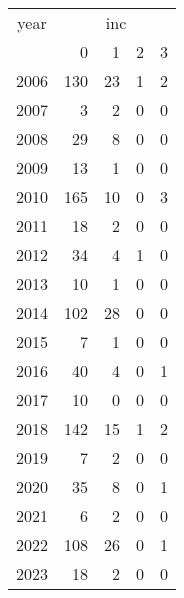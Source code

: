 \footnotesize\begin{tabular}[t]{lrrrr}
\toprule
\multicolumn{1}{c}{year} & \multicolumn{4}{c}{inc} \\
\cmidrule(l{3pt}r{3pt}){1-1} \cmidrule(l{3pt}r{3pt}){2-5}
  & 0 & 1 & 2 & 3\\
\midrule
2006 & 130 & 23 & 1 & 2\\
2007 & 3 & 2 & 0 & 0\\
2008 & 29 & 8 & 0 & 0\\
2009 & 13 & 1 & 0 & 0\\
2010 & 165 & 10 & 0 & 3\\
2011 & 18 & 2 & 0 & 0\\
2012 & 34 & 4 & 1 & 0\\
2013 & 10 & 1 & 0 & 0\\
2014 & 102 & 28 & 0 & 0\\
2015 & 7 & 1 & 0 & 0\\
2016 & 40 & 4 & 0 & 1\\
2017 & 10 & 0 & 0 & 0\\
2018 & 142 & 15 & 1 & 2\\
2019 & 7 & 2 & 0 & 0\\
2020 & 35 & 8 & 0 & 1\\
2021 & 6 & 2 & 0 & 0\\
2022 & 108 & 26 & 0 & 1\\
2023 & 18 & 2 & 0 & 0\\
\bottomrule
\end{tabular}

